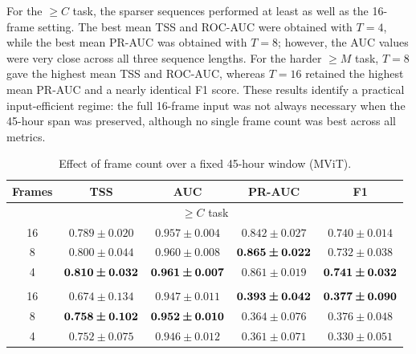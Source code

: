 \documentclass[runningheads]{llncs}
\begin{document}
For the $\geq C$ task, the sparser sequences performed at least as well as the 16-frame setting. The best mean TSS and ROC-AUC were obtained with $T=4$, while the best mean PR-AUC was obtained with $T=8$; however, the AUC values were very close across all three sequence lengths. For the harder $\geq M$ task, $T=8$ gave the highest mean TSS and ROC-AUC, whereas $T=16$ retained the highest mean PR-AUC and a nearly identical F1 score. These results identify a practical input-efficient regime: the full 16-frame input was not always necessary when the 45-hour span was preserved, although no single frame count was best across all metrics.

\begin{table}[H]
\caption{Effect of frame count over a fixed 45-hour window (MViT).}
\centering
\label{tab:frames}
\scriptsize
\setlength{\tabcolsep}{6pt}
\begin{tabular}{@{}ccccc@{}}
\toprule
Frames & TSS & AUC & PR-AUC & F1 \\
\midrule
\multicolumn{5}{c}{$\geq C$ task} \\
\midrule
16 & $0.789 \pm 0.020$ & $0.957 \pm 0.004$ & $0.842 \pm 0.027$ & $0.740 \pm 0.014$ \\
8  & $0.800 \pm 0.044$ & $0.960 \pm 0.008$ & $\bm{0.865 \pm 0.022}$ & $0.732 \pm 0.038$ \\
4  & $\bm{0.810 \pm 0.032}$ & $\bm{0.961 \pm 0.007}$ & $0.861 \pm 0.019$ & $\bm{0.741 \pm 0.032}$ \\
\addlinespace
\multicolumn{5}{c}{$\geq M$ task} \\
\midrule
16 & $0.674 \pm 0.134$ & $0.947 \pm 0.011$ & $\bm{0.393 \pm 0.042}$ & $\bm{0.377 \pm 0.090}$ \\
8  & $\bm{0.758 \pm 0.102}$ & $\bm{0.952 \pm 0.010}$ & $0.364 \pm 0.076$ & $0.376 \pm 0.048$ \\
4  & $0.752 \pm 0.075$ & $0.946 \pm 0.012$ & $0.361 \pm 0.071$ & $0.330 \pm 0.051$ \\
\bottomrule
\end{tabular}
\end{table}


\end{document}
